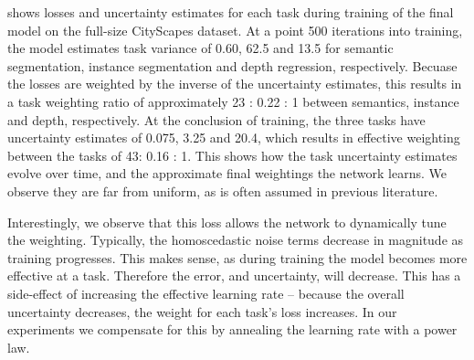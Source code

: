  shows losses and uncertainty estimates for each task during training of the final model on the full-size CityScapes dataset. At a point 500 iterations into training, the model estimates task variance of 0.60, 62.5 and 13.5 for semantic segmentation, instance segmentation and depth regression, respectively. Becuase the losses are weighted by the inverse of the uncertainty estimates, this results in a task weighting ratio of approximately 23 : 0.22 : 1 between semantics, instance and depth, respectively. At the conclusion of training, the three tasks have uncertainty estimates of 0.075, 3.25 and 20.4, which results in effective weighting between the tasks of 43: 0.16 : 1. This shows how the task uncertainty estimates evolve over time, and the approximate final weightings the network learns. We observe they are far from uniform, as is often assumed in previous literature.

Interestingly, we observe that this loss allows the network to dynamically tune the weighting. Typically, the homoscedastic noise terms decrease in magnitude as training progresses. This makes sense, as during training the model becomes more effective at a task. Therefore the error, and uncertainty, will decrease. This has a side-effect of increasing the effective learning rate -- because the overall uncertainty decreases, the weight for each task's loss increases. In our experiments we compensate for this by annealing the learning rate with a power law.


